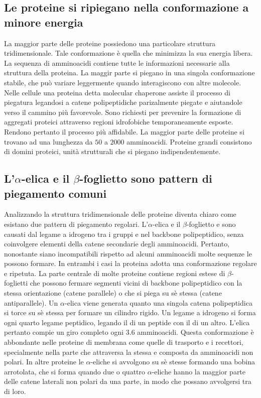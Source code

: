 \subsection{Le proteine si ripiegano nella conformazione a minore energia}
La maggior parte delle proteine possiedono una particolare struttura tridimensionale. Tale conformazione \`e quella che minimizza la sua energia libera. 
La sequenza di amminoacidi contiene tutte le informazioni necessarie alla struttura della proteina. La maggir parte si piegano in una singola 
conformazione stabile, che pu\`o variare leggermente quando interagiscono con altre molecole. Nelle cellule una proteina detta molecular chaperone assiste
il processo di piegatura legandosi a catene polipeptidiche parizalmente piegate e aiutandole verso il cammino pi\`u favorevole. Sono richiesti per 
prevenire la formazione di aggregati proteici attraverso regioni idrofobiche temporaneamente esposte. Rendono pertanto il processo pi\`u affidabile. La
maggior parte delle proteine si trovano ad una lunghezza da $50$ a $2000$ amminoacidi. Proteine grandi consistono di domini proteici, unit\`a strutturali 
che si piegano indipendentemente. 
\subsection{L'$\alpha$-elica e il $\beta$-foglietto sono pattern di piegamento comuni}
Analizzando la struttura tridimensionale delle proteine diventa chiaro come esistano due pattern di piegamento regolari. L'$\alpha$-elica e il 
$\beta$-foglietto e sono causati dal legame a idrogeno tra i gruppi  e  nel backbone polipeptidico, senza coinvolgere elementi della 
catene secondarie degli amminoacidi. Pertanto, nonostante siano incompatibili rispetto ad alcuni amminoacidi molte sequenze le possono formare. In 
entrambi i casi la proteina adotta una conformazione regolare e ripetuta. La parte centrale di molte proteine contiene regioni estese di 
$\beta$-foglietti che possono fermare segmenti vicini di backbone polipeptidico con la stessa orientazione (catene parallele) o che si piega su s\`e 
stessa (catene antiparallele). Un $\alpha$-elica viene generata quanto una singola catena polipeptidica si torce su s\`e stessa per formare un cilindro
rigido. Un legame a idrogeno si forma ogni quarto legame peptidico, legando il  di un peptide con il  di un altro. L'elica pertanto
compie un giro completo ogni $3.6$ amminoacidi. Questa conformazione \`e abbondante nelle proteine di membrana come quelle di trasporto e i recettori, 
specialmente nella parte che attraversa la stessa e composta da amminoacidi non polari. In altre proteine le $\alpha$-eliche si avvolgono su s\`e stesse
formando una bobina arrotolata, che si forma quando due o quattro $\alpha$-eliche hanno la maggior parte delle catene laterali non polari da una parte, in
modo che possano avvolgersi tra di loro. 
